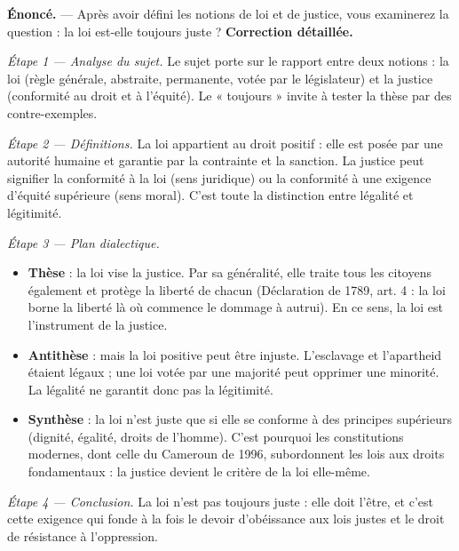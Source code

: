 \documentclass[11pt]{article}
\newcommand{\cle}[1]{{\popxbold\color{popdark}#1}}
\begin{document}
\begin{exoresolu}
\textbf{Énoncé.} — Après avoir défini les notions de loi et de justice, vous examinerez la question : la loi est-elle toujours juste ?
\tcblower
\textbf{Correction détaillée.}

\emph{Étape 1 — Analyse du sujet.} Le sujet porte sur le rapport entre deux notions : la \cle{loi} (règle générale, abstraite, permanente, votée par le législateur) et la \cle{justice} (conformité au droit et à l'équité). Le « toujours » invite à tester la thèse par des contre-exemples.

\emph{Étape 2 — Définitions.} La loi appartient au droit positif : elle est posée par une autorité humaine et garantie par la contrainte et la sanction. La justice peut signifier la conformité à la loi (sens juridique) ou la conformité à une exigence d'équité supérieure (sens moral). C'est toute la distinction entre légalité et légitimité.

\emph{Étape 3 — Plan dialectique.}
\begin{itemize}
  \item \textbf{Thèse} : la loi vise la justice. Par sa généralité, elle traite tous les citoyens également et protège la liberté de chacun (Déclaration de 1789, art. 4 : la loi borne la liberté là où commence le dommage à autrui). En ce sens, la loi est l'instrument de la justice.
  \item \textbf{Antithèse} : mais la loi positive peut être injuste. L'esclavage et l'apartheid étaient légaux ; une loi votée par une majorité peut opprimer une minorité. La légalité ne garantit donc pas la légitimité.
  \item \textbf{Synthèse} : la loi n'est juste que si elle se conforme à des principes supérieurs (dignité, égalité, droits de l'homme). C'est pourquoi les constitutions modernes, dont celle du Cameroun de 1996, subordonnent les lois aux droits fondamentaux : la justice devient le critère de la loi elle-même.
\end{itemize}

\emph{Étape 4 — Conclusion.} La loi n'est pas toujours juste : elle doit l'être, et c'est cette exigence qui fonde à la fois le devoir d'obéissance aux lois justes et le droit de résistance à l'oppression.
\end{exoresolu}
\end{document}
